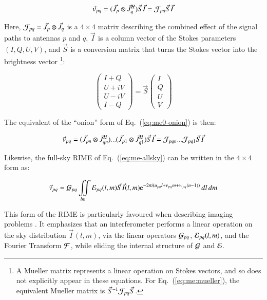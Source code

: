 \documentclass{aa}
\newcommand{\herm}{H}
\newcommand{\jones}[2]{\vec {#1}_{#2}}
\newcommand{\jonesinv}[2]{\vec {#1}^{-1}_{#2}}
\newcommand{\jonesT}[2]{\vec {#1}^{\herm}_{#2}}
\begin{document}
    \begin{equation}\label{eq:me:mueller}
    \vec v_{pq} = ( \jones{J}{p} \otimes \jonesT{J}{q} ) \jones{S}{} \jones{I}{} = {\cal J}_{pq} \jones{S}{} \jones{I}{}
    \end{equation}

Here, ${\cal J}_{pq}=\jones{J}{p} \otimes \jones{J}{q}$ is a $4\times4$ matrix describing the combined effect of the signal paths to antennas $p$ and $q$, $\jones{I}{}$ is a column vector of the Stokes parameters $(I,Q,U,V)$, and $\jones{S}{}$ is a conversion matrix that turns the Stokes vector into the brightness vector
\footnote{A Mueller matrix represents a linear operation on Stokes vectors, and so does not explicitly appear in these equations. For Eq.~(\ref{eq:me:mueller}), the equivalent Mueller matrix is  $\jonesinv{S}{}{\cal J}_{pq}\jones{S}{}$.}:


\[
\left ( \begin{array}{c}
I+Q \\ U+iV \\ U-iV \\ I-Q
\end{array} \right ) 
= \jones{S}{} 
\left ( \begin{array}{c}
I \\ Q \\ U \\ V
\end{array} \right ) 
\]

 
The equivalent of the ``onion'' form of Eq.~(\ref{eq:me0-onion}) is then:

    \begin{equation}\label{eq:me:mueller-onion}
    \vec v_{pq} = ( \jones{J}{pn} \otimes \jonesT{J}{qn} ) ... ( \jones{J}{p1} \otimes \jonesT{J}{q1} ) \jones{S}{} \jones{I}{}
= {\cal J}_{pqn} ...  {\cal J}_{pq1} \jones{S}{} \jones{I}{}
    \end{equation}


Likewise, the full-sky RIME of Eq.~(\ref{eq:me-allsky}) can be written in the $4\times4$ form as:

    \begin{equation}\label{eq:allsky:mueller}
\vec v_{pq} = {\cal G}_{pq} \iint\limits_{lm} {\cal E}_{pq}(l,m) \jones{S}{} \jones{I}{}(l,m) {\rm e}^{-2\pi i(u_{pq} l+v_{pq} m+w_{pq} (n-1))} \,dl\,dm 
    \end{equation}

This form of the RIME is particularly favoured when describing imaging problems \citep{SB:imageplane,Rau:DDEs}. It emphasizes that an interferometer performs a linear operation on the sky distribution $\jones{I}{}(l,m)$, via the linear operators ${\cal G}_{pq}$, ${\cal E}_{pq}(l,m)$, and the Fourier Transform $\cal F$, while eliding the internal structure of ${\cal G}$ and ${\cal E}$.
\end{document}
